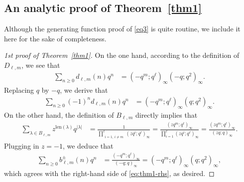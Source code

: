 \documentclass[12pt,reqno]{amsart}
\numberwithin{equation}{section}
\newcommand{\len}{\mathrm{len}}
\begin{document}
\subsection{An analytic proof of Theorem~\ref{thm1}}

Although the generating function proof of \eqref{eq3} is quite routine, we include it here for the sake of completeness. 
\begin{proof}[1st proof of Theorem~\ref{thm1}]
On the one hand, according to the definition of $D_{\ell,m}$, we see that
\begin{align*}
	\sum_{n\ge 0}d_{\ell,m}(n)q^n &= (-q^m;q^{\ell})_{\infty}(-q;q^2)_{\infty}.
\end{align*}
Replacing $q$ by $-q$, we derive that
\begin{align}\label{eq:thm1-rhs}
\sum_{n\ge 0}(-1)^n d_{\ell,m}(n)q^n &= (-q^m;q^{\ell})_{\infty}(q;q^2)_{\infty}.
\end{align}
On the other hand, the definition of $B_{\ell,m}$ directly implies that
\begin{align*}
	\sum_{\lambda\in B_{\ell,m}}z^{\len(\lambda)}q^{|\lambda|} &= \frac{1}{\prod\limits_{\substack{i=1,\, i\not = m}}^{\ell} (zq^i;q^\ell)_\infty}=\frac{(zq^{m};q^{\ell})_{\infty}}{\prod_{i=1}^{\ell} (zq^i;q^\ell)_\infty}=\frac{(zq^{m};q^{\ell})_{\infty}}{(zq;q)_\infty}.
\end{align*}
Plugging in $z=-1$, we deduce that
\begin{align*}
\sum_{n\ge 0}b^{\pm}_{\ell,m}(n)q^n &= \frac{(-q^{m};q^{\ell})_{\infty}}{(-q;q)_\infty}=(-q^m;q^{\ell})_{\infty}(q;q^2)_{\infty},
\end{align*}
which agrees with the right-hand side of \eqref{eq:thm1-rhs}, as desired.
\end{proof}
\end{document}
